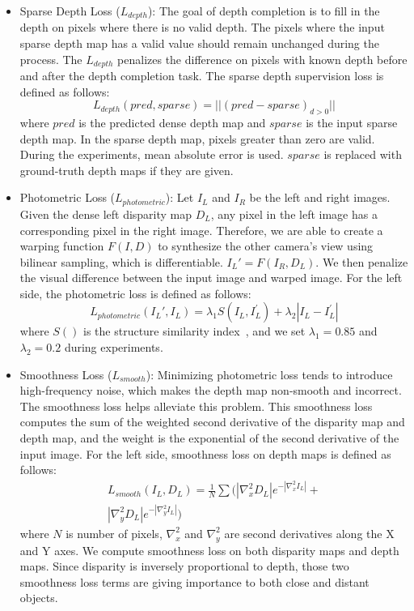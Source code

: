 \documentclass[letterpaper, 10 pt, conference]{ieeeconf}
\begin{document}
    \begin{itemize}
    \item
    Sparse Depth Loss ($L_{depth}$): The goal of depth completion is to fill in the depth on pixels where there is no valid depth. The pixels where the input sparse depth map has a valid value should remain unchanged during the process. The $L_{depth}$ penalizes the difference on pixels with known depth before and after the depth completion task. The sparse depth supervision loss is defined as follows:
    \begin{equation}
        L_{depth}(pred, sparse) = || (pred - sparse)_{d>0} ||
    \end{equation}
    where $pred$ is the predicted dense depth map and $sparse$ is the input sparse depth map. In the sparse depth map, pixels greater than zero are valid. During the experiments, mean absolute error is used. $sparse$ is replaced with ground-truth depth maps if they are given.
  
    \item  
    Photometric Loss ($L_{photometric}$): Let $I_L$ and $I_R$ be the left and right images. Given the dense left disparity map $D_L$, any pixel in the left image has a corresponding pixel in the right image. Therefore, we are able to create a warping function $F(I, D)$ to synthesize the other camera's view using bilinear sampling, which is differentiable. $I_{L}' = F(I_R, D_L)$. We then penalize the visual difference between the input image and warped image. For the left side, the photometric loss is defined as follows:
    \begin{equation}
        L_{photometric}(I_{L}', I_{L}) = \lambda_1 S(I_L,I_L^{'}) + \lambda_2 |I_L - I_{L}^{'}|
    \end{equation}
    where $S()$ is the structure similarity index~\cite{SSIM}, and we set $\lambda_1 = 0.85$ and $\lambda_2 = 0.2$ during experiments.

    \item  
    Smoothness Loss ($L_{smooth}$): Minimizing photometric loss tends to introduce high-frequency noise, which makes the depth map non-smooth and incorrect. The smoothness loss helps alleviate this problem. 
    This smoothness loss computes the sum of the weighted second derivative of the disparity map and depth map, and the weight is the exponential of the second derivative of the input image. For the left side, smoothness loss on depth maps is defined as follows:
    \begin{equation}
    \begin{split}
        L_{smooth}(I_L, D_L) = \frac{1}{N}\sum (|\nabla_{x}^{2}D_L|e^{-|\nabla_{x}^{2}I_L|} +\\  |\nabla_{y}^{2}D_L|e^{-|\nabla_{y}^{2}I_L|})
    \end{split}
    \end{equation}
    where $N$ is number of pixels, $\nabla_{x}^{2}$ and $\nabla_{y}^{2}$ are second derivatives along the X and Y axes. We compute smoothness loss on both disparity maps and depth maps. Since disparity is inversely proportional to depth, those two smoothness loss terms are giving importance to both close and distant objects.

    \end{itemize}
\end{document}

